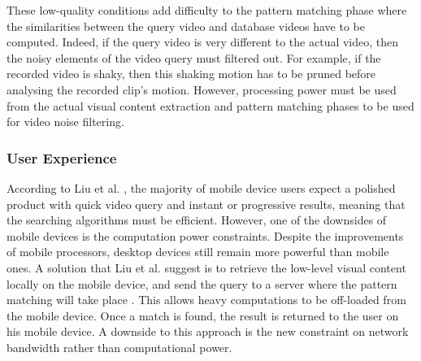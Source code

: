 \documentclass[11pt,openany,a4paper]{article}
\begin{document}
These low-quality conditions add difficulty to the pattern matching phase where the similarities between the query video and database videos have to be computed. Indeed, if the query video is very different to the actual video, then the noisy elements of the video query must filtered out. For example, if the recorded video is shaky, then this shaking motion has to be pruned before analysing the recorded clip's motion. However, processing power must be used from the actual visual content extraction and pattern matching phases to be used for video noise filtering.

\subsubsection{User Experience}
\label{sec:user-experience}

According to Liu et al. \cite{liu2014mobilevideosearch}, the majority of mobile device users expect a polished product with quick video query and instant or progressive results, meaning that the searching algorithms must be efficient. However, one of the downsides of mobile devices is the computation power constraints. Despite the improvements of mobile processors, desktop devices still remain more powerful than mobile ones. A solution that Liu et al. suggest is to retrieve the low-level visual content locally on the mobile device, and send the query to a server where the pattern matching will take place \cite{liu2014mobilevideosearch}. This allows heavy computations to be off-loaded from the mobile device. Once a match is found, the result is returned to the user on his mobile device. A downside to this approach is the new constraint on network bandwidth rather than computational power.

\end{document}

